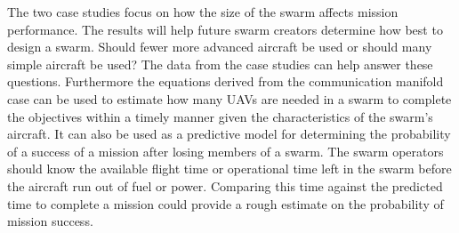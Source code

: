 The two case studies focus on how the size of the swarm affects mission performance.  The results will help future swarm creators determine how best to design a swarm.  Should fewer more advanced aircraft be used or should many simple aircraft be used?  The data from the case studies can help answer these questions.   Furthermore the equations derived from the communication manifold case can be used to estimate how many UAVs are needed in a swarm to complete the objectives within a timely manner given the characteristics of the swarm’s aircraft.  It can also be used as a predictive model for determining the probability of a success of a mission after losing members of a swarm.  The swarm operators should know the available flight time or operational time left in the swarm before the aircraft run out of fuel or power.  Comparing this time against the predicted time to complete a mission could provide a rough estimate on the probability of mission success.